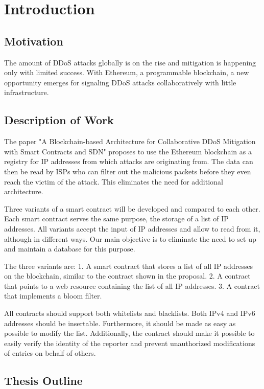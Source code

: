 \chapter{Introduction}

\section{Motivation}

The amount of DDoS attacks globally is on the rise and mitigation is happening only with limited success. With Ethereum, a programmable blockchain, a new opportunity emerges for signaling DDoS attacks collaboratively with little infrastructure. 

\section{Description of Work}

The paper {"}A Blockchain-based Architecture for Collaborative DDoS Mitigation with Smart Contracts and SDN{"} \cite{OriginalPaper} proposes to use the Ethereum blockchain as a registry for IP addresses from which attacks are originating from. The data can then be read by ISPs who can filter out the malicious packets before they even reach the victim of the attack. This eliminates the need for additional architecture.

Three variants of a smart contract will be developed and compared to each other. Each smart contract serves the same purpose, the storage of a list of IP addresses. All variants accept the input of IP addresses and allow to read from it, although in different ways.
Our main objective is to eliminate the need to set up and maintain a database for this purpose.

The three variants are: 1. A smart contract that stores a list of all IP addresses on the blockchain, similar to the contract shown in the proposal. 2. A contract that points to a web resource containing the list of all IP addresses. 3. A contract that implements a bloom filter.

All contracts should support both whitelists and blacklists. Both IPv4 and IPv6 addresses should be insertable. Furthermore, it should be made as easy as possible to modify the list. Additionally, the contract should make it possible to easily verify the identity of the reporter and prevent unauthorized modifications of entries on behalf of others. 

\section{Thesis Outline}

